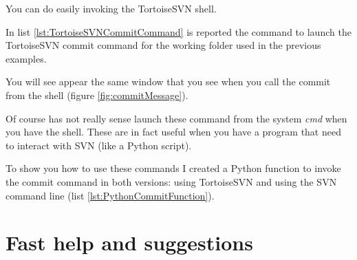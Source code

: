 You can do easily invoking the TortoiseSVN shell.\newline

In list \ref{lst:TortoiseSVNCommitCommand} is reported the command to launch the TortoiseSVN commit command for the working folder used in the previous examples.




You will see appear the same window that you see when you call the commit from the shell (figure \ref{fig:commitMessage}).



Of course has not really sense launch these command from the system \textit{cmd} when you have the shell. These are in fact useful when you have a program that need to interact with SVN (like a Python script).

To show you how to use these commands I created a Python function to invoke the commit command in both versions: using TortoiseSVN and using the SVN command line (list \ref{lst:PythonCommitFunction}).


\newpage





\newpage












\section{Fast help and suggestions}
\label{fastHelp}


